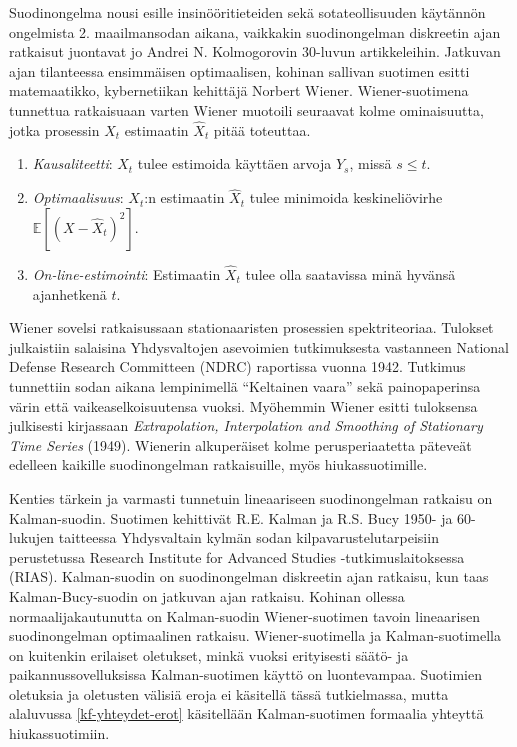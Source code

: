 \documentclass[
  12pt,
  a4paper, twoside]{book}
\begin{document}
Suodinongelma nousi esille insinööritieteiden sekä sotateollisuuden käytännön ongelmista 2. maailmansodan aikana, vaikkakin suodinongelman diskreetin ajan ratkaisut juontavat jo Andrei N. Kolmogorovin 30-luvun artikkeleihin. Jatkuvan ajan tilanteessa ensimmäisen optimaalisen, kohinan sallivan suotimen esitti matemaatikko, kybernetiikan kehittäjä Norbert Wiener. Wiener-suotimena tunnettua ratkaisuaan varten Wiener muotoili seuraavat kolme ominaisuutta, jotka prosessin \(X_t\) estimaatin \(\hat{X}_t\) pitää toteuttaa.

\begin{enumerate}
\vspace{\baselineskip}
\item \textit{Kausaliteetti}: $X_t$ tulee estimoida käyttäen arvoja $Y_s$, missä $s \leq t$.
\item \textit{Optimaalisuus}: $X_t$:n estimaatin $\hat{X}_t$ tulee minimoida keskineliövirhe $\mathbb{E}[(X-\hat{X}_t)^2]$.
\item \textit{On-line-estimointi}: Estimaatin $\hat{X}_t$ tulee olla saatavissa minä hyvänsä ajanhetkenä $t$. 
\vspace{\baselineskip}
\end{enumerate}

Wiener sovelsi ratkaisussaan stationaaristen prosessien spektriteoriaa. Tulokset julkaistiin salaisina Yhdysvaltojen asevoimien tutkimuksesta vastanneen National Defense Research Committeen (NDRC) raportissa vuonna 1942. Tutkimus tunnettiin sodan aikana lempinimellä ``Keltainen vaara'' sekä painopaperinsa värin että vaikeaselkoisuutensa vuoksi. Myöhemmin Wiener esitti tuloksensa julkisesti kirjassaan \textit{Extrapolation, Interpolation and Smoothing of Stationary Time Series} (1949). Wienerin alkuperäiset kolme perusperiaatetta päteveät edelleen kaikille suodinongelman ratkaisuille, myös hiukassuotimille.

Kenties tärkein ja varmasti tunnetuin lineaariseen suodinongelman ratkaisu on Kalman-suodin. Suotimen kehittivät R.E. Kalman ja R.S. Bucy 1950- ja 60-lukujen taitteessa Yhdysvaltain kylmän sodan kilpavarustelutarpeisiin perustetussa Research Institute for Advanced Studies -tutkimuslaitoksessa (RIAS). Kalman-suodin on suodinongelman diskreetin ajan ratkaisu, kun taas Kalman-Bucy-suodin on jatkuvan ajan ratkaisu. Kohinan ollessa normaalijakautunutta on Kalman-suodin Wiener-suotimen tavoin lineaarisen suodinongelman optimaalinen ratkaisu. Wiener-suotimella ja Kalman-suotimella on kuitenkin erilaiset oletukset, minkä vuoksi erityisesti säätö- ja paikannussovelluksissa Kalman-suotimen käyttö on luontevampaa. Suotimien oletuksia ja oletusten välisiä eroja ei käsitellä tässä tutkielmassa, mutta alaluvussa \ref{kf-yhteydet-erot} käsitellään Kalman-suotimen formaalia yhteyttä hiukassuotimiin.
\end{document}
